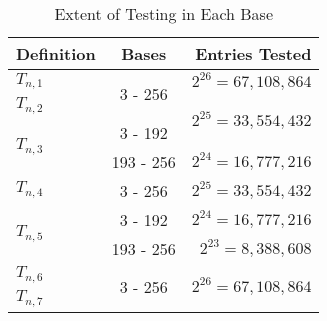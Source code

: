 \documentclass[conference]{IEEEtran}
\begin{document}
\begin{table}[H]
\label{tab:testing_bn}
\caption{Extent of Testing in Each Base}
\centering
\begin{tabular}{|l|c|r|}
\hline
\textbf{Definition}       & \textbf{Bases}         & \textbf{Entries Tested}              \\\hline
$T_{n,1}$                 &\multirow{2}{*}{3 - 256}& $2^{26} = 67,108,864$                \\\cline{1-1}\cline{3-3}
$T_{n,2}$                 &                        &\multirow{2}{*}{$2^{25} = 33,554,432$}\\\cline{1-2}
\multirow{2}{*}{$T_{n,3}$}& 3 - 192                &                                      \\\cline{2-3} 
                          & 193 - 256              & $2^{24} = 16,777,216$                \\\hline
$T_{n,4}$                 & 3 - 256                & $2^{25} = 33,554,432$                \\\hline
\multirow{2}{*}{$T_{n,5}$}& 3 - 192                & $2^{24} = 16,777,216$                \\\cline{2-3} 
                          & 193 - 256              & $2^{23} = 8,388,608$                 \\\hline
$T_{n,6}$                 &\multirow{2}{*}{3 - 256}&\multirow{2}{*}{$2^{26} = 67,108,864$}\\\cline{1-1}
$T_{n,7}$                 &                        &                                      \\\hline
\end{tabular}
\end{table}
\end{document}
